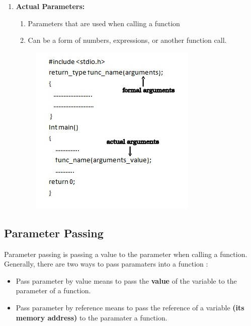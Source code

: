 \begin{enumerate}
    \item \textbf{Actual Parameters:}
          \begin{enumerate}

              \item Parameters that are used when calling a function

              \item Can be a form of numbers,
                    expressions, or another function call.
          \end{enumerate}
          \begin{figure}[H]
              \centering
              \includegraphics[width=0.5\linewidth]{P3/img/screenshot006.png}
              \caption{}
              \label{fig:parameterformalaktual}
          \end{figure}
\end{enumerate}
\subsection{Parameter Passing}
Parameter passing is passing a value to the parameter when calling a function.
Generally, there are two ways to pass paramaters into a function :
\begin{itemize}
    \item Pass parameter by value means to pass the
          \textbf{value} of the variable to the parameter of a function.

    \item Pass parameter by reference means to pass the
          reference of a variable \textbf{(its memory address)} to
          the paramater a function.
\end{itemize}

